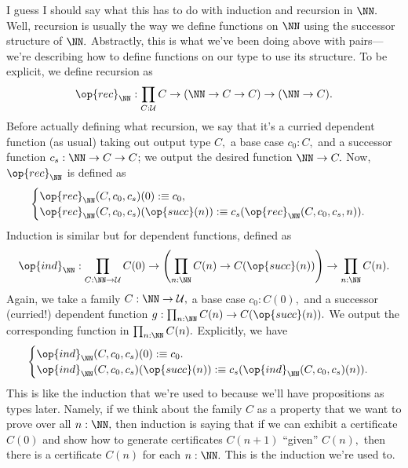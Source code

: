 I guess I should say what this has to do with induction and recursion in $\NN.$ Well, recursion is usually the way we define functions on $\NN$ using the successor structure of $\NN.$ Abstractly, this is what we've been doing above with pairs---we're describing how to define functions on our type to use its structure. To be explicit, we define recursion as
\[\op{rec}_\NN:\prod_{C:\mathcal U}C\to(\NN\to C\to C)\to(\NN\to C).\]
Before actually defining what recursion, we say that it's a curried dependent function (as usual) taking out output type $C,$ a base case $c_0:C,$ and a successor function $c_s:\NN\to C\to C$; we output the desired function $\NN\to C.$ Now, $\op{rec}_\NN$ is defined as 
\[\begin{cases}
    \op{rec}_\NN(C,c_0,c_s)(0):\equiv c_0, \\
    \op{rec}_\NN(C,c_0,c_s)(\op{succ}(n)):\equiv c_s(\op{rec}_\NN(C,c_0,c_s,n)).
\end{cases}\]
Induction is similar but for dependent functions, defined as
\[\op{ind}_\NN:\prod_{C:\NN\to\mathcal U}C(0)\to\left(\prod_{n:\NN}C(n)\to C(\op{succ}(n))\right)\to\prod_{n:\NN}C(n).\]
Again, we take a family $C:\NN\to\mathcal U,$ a base case $c_0:C(0),$ and a successor (curried!) dependent function $g:\prod_{n:\NN}C(n)\to C(\op{succ}(n)).$ We output the corresponding function in $\prod_{n:\NN}C(n).$ Explicitly, we have
\[\begin{cases}
    \op{ind}_\NN(C,c_0,c_s)(0):\equiv c_0. \\
    \op{ind}_\NN(C,c_0,c_s)(\op{succ}(n)):\equiv c_s(\op{ind}_\NN(C,c_0,c_s)(n)).
\end{cases}\]
This is like the induction that we're used to because we'll have propositions as types later. Namely, if we think about the family $C$ as a property that we want to prove over all $n:\NN,$ then induction is saying that if we can exhibit a certificate $C(0)$ and show how to generate certificates $C(n+1)$ ``given'' $C(n),$ then there is a certificate $C(n)$ for each $n:\NN.$ This is the induction we're used to.

